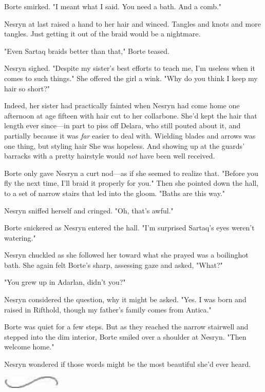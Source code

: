 Borte smirked. "I meant what I said. You need a bath. And a comb."

Nesryn at last raised a hand to her hair and winced. Tangles and knots and more tangles. Just getting it out of the braid would be a nightmare.

"Even Sartaq braids better than that," Borte teased.

Nesryn sighed. "Despite my sister's best efforts to teach me, I'm useless when it comes to such things." She offered the girl a wink. "Why do you think I keep my hair so short?"

Indeed, her sister had practically fainted when Nesryn had come home one afternoon at age fifteen with hair cut to her collarbone. She'd kept the hair that length ever since---in part to piss off Delara, who still pouted about it, and partially because it was \emph{far} easier to deal with. Wielding blades and arrows was one thing, but styling hair
 She was hopeless. And showing up at the guards' barracks with a pretty hairstyle would \emph{not} have been well received.

Borte only gave Nesryn a curt nod---as if she seemed to realize that. "Before you fly the next time, I'll braid it properly for you." Then she pointed down the hall, to a set of narrow stairs that led into the gloom. "Baths are this way."

Nesryn sniffed herself and cringed. "Oh, that's awful."

Borte snickered as Nesryn entered the hall. "I'm surprised Sartaq's eyes weren't watering."

Nesryn chuckled as she followed her toward what she prayed was a boilinghot bath. She again felt Borte's sharp, assessing gaze and asked, "What?"

"You grew up in Adarlan, didn't you?"

Nesryn considered the question, why it might be asked. "Yes. I was born and raised in Rifthold, though my father's family comes from Antica."

Borte was quiet for a few steps. But as they reached the narrow stairwell and stepped into the dim interior, Borte smiled over a shoulder at Nesryn. "Then welcome home."

Nesryn wondered if those words might be the most beautiful she'd ever heard.

\includegraphics[width=1.12in,height=0.24in]{images/seperator}

